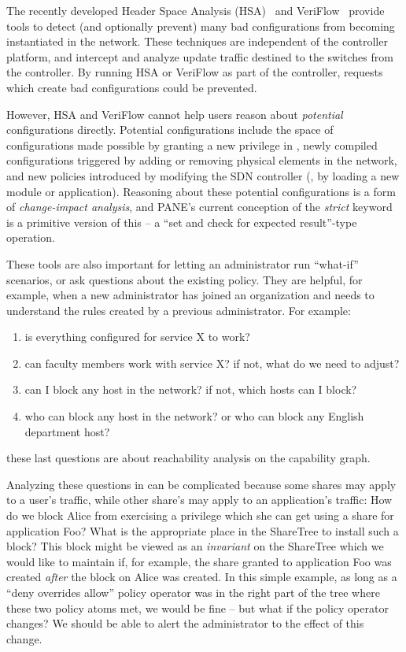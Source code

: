 The recently developed Header Space Analysis (HSA)~\cite{HSA} and
VeriFlow~\cite{VeriFlow} provide tools to detect (and optionally prevent) many bad
configurations from becoming instantiated in the network. These techniques are
independent of the controller platform, and intercept and analyze update traffic
destined to the switches from the controller. By running HSA or VeriFlow as part
of the \sys controller, requests which create bad configurations could be prevented.

However, HSA and VeriFlow cannot help users reason about \emph{potential}
configurations directly. Potential configurations include the space of configurations
made possible by granting a new privilege in \sys, newly compiled configurations
triggered by adding or removing physical elements in the network, and new
policies introduced by modifying the SDN controller (\eg, by loading a new module
or application). Reasoning about these potential configurations is a form
of \emph{change-impact analysis}, and PANE's current conception of the
\emph{strict} keyword is a primitive version of  this -- a
``set and check for expected result''-type operation.

These tools are also important for letting an administrator run ``what-if'' scenarios, 
or ask questions about the existing policy. They are helpful, for example, when 
a new administrator has joined an organization and needs to understand the 
rules created by a previous administrator. For example:

{\singlespacing
\begin{enumerate}
\item is everything configured for service X to work? 
\item can faculty members work with service X? if not, what do we need to adjust?
\item can I block any host in the network? if not, which hosts can I block?
\item who can block any host in the network? or who can block any English 
department host?
\end{enumerate}
}

these last questions are about reachability analysis on the capability graph.

Analyzing these questions in \sys can be complicated because some shares 
may apply to a user's traffic, while other share's may apply to an application's 
traffic: How do we block Alice from exercising a privilege which she can get using 
a share for application Foo? What is the appropriate place in the ShareTree to install such 
a block? This block might be viewed as an \emph{invariant} on the ShareTree which we 
would like to maintain if, for example, the share granted to application Foo 
was created \emph{after} the block on Alice was created. In this simple example, 
as long as a ``deny overrides allow'' policy operator was in the right part of 
the tree where these two policy atoms met, we would be fine -- but what if the 
policy operator changes? We should be able to alert the administrator to the 
effect of this change.


